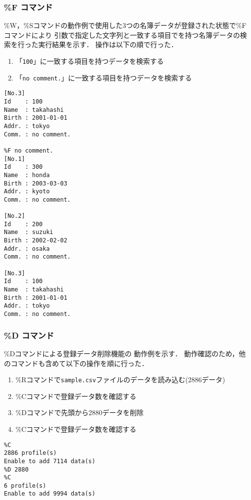 \subsubsection{\%F コマンド}
\%W，\%Sコマンドの動作例で使用した3つの名簿データが登録された状態で\%Fコマンドにより
引数で指定した文字列と一致する項目でを持つ名簿データの検索を行った実行結果を示す．
操作は以下の順で行った．
\begin{enumerate}
  \item 「\verb|100|」に一致する項目を持つデータを検索する
  \item 「\verb|no comment.|」に一致する項目を持つデータを検索する
\end{enumerate}

\begin{Verbatim}[numbers=none, numbersep=6pt, frame=single,
  fontsize=\small, baselinestretch=0.8]
%F 100
[No.3]
Id    : 100
Name  : takahashi
Birth : 2001-01-01
Addr. : tokyo
Comm. : no comment.

%F no comment.
[No.1]
Id    : 300
Name  : honda
Birth : 2003-03-03
Addr. : kyoto
Comm. : no comment.

[No.2]
Id    : 200
Name  : suzuki
Birth : 2002-02-02
Addr. : osaka
Comm. : no comment.

[No.3]
Id    : 100
Name  : takahashi
Birth : 2001-01-01
Addr. : tokyo
Comm. : no comment.  
\end{Verbatim}

\subsubsection{\%D コマンド}
\%Dコマンドによる登録データ削除機能の
動作例を示す．
動作確認のため，他のコマンドも含めて以下の操作を順に行った．
\begin{enumerate}
  \item \%Rコマンドで\verb|sample.csv|ファイルのデータを読み込む(2886データ)
  \item \%Cコマンドで登録データ数を確認する
  \item \%Dコマンドで先頭から2880データを削除
  \item \%Cコマンドで登録データ数を確認する
\end{enumerate}

\begin{Verbatim}[numbers=none, numbersep=6pt, frame=single,
  fontsize=\small, baselinestretch=0.8]
%R sample.csv
%C
2886 profile(s)
Enable to add 7114 data(s)
%D 2880
%C
6 profile(s)
Enable to add 9994 data(s)  
\end{Verbatim}

